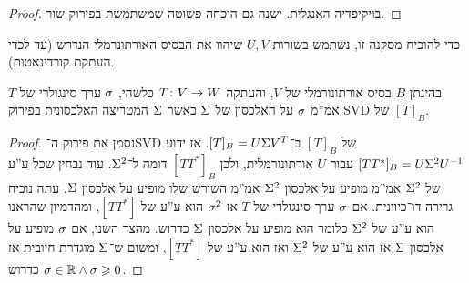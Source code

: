 \documentclass[name=רשימות אלגברה לינארית 2א]{../../../tex/classes/megasumPreamble}
\begin{document}
	\begin{proof}
		בויקיפדיה האנגלית. ישנה גם הוכחה פשוטה שמשתמשת בפירוק שור. 
	\end{proof}
	כדי להוכיח מסקנה זו, נשתמש בשורות $U, V$ שיהוו את הבסיס האורתונרמלי הנדרש (עד לכדי העתקת קורדינאטות). 
	
	\begin{Theorem}
		בהינתן $B$ בסיס אורתונורמלי של $V$, והעתקה $T \colon V \to W$ כלשהי, $\sigma$ ערך סינגולרי של $T$ אמ''מ $\sigma$ על האלכסון של $\Sigma$ כאשר $\Sigma$ המטריצה האלכסונית בפירוק SVD של $[T]_B$. 
	\end{Theorem}
	\begin{proof}
		נסמן את פירוק ה־SVD של $[T]_B$ ב־$[T]_B = U\Sigma V^{T}$. אז ידוע $[TT^*]_B = U\Sigma^2 U^{-1}$ עבור $U$ אורתונורמלית, ולכן $[TT^*]_B$ דומה ל־$\Sigma^2$. עוד נבחין שכל ע''ע של $\Sigma^2$ אמ''מ מופיע על אלכסון $\Sigma^2$ אמ''מ השורש שלו מופיע על אלכסון $\Sigma$. עתה נוכיח גרירה דו־כיוונית. אם $\sigma$ ערך סינגולרי של $T$ אז $\sigma^2$ הוא ע''ע של $[TT^*]$, ומהדמיון שהראנו הוא ע''ע של $\Sigma^2$ כלומר הוא מופיע על אלכסון $\Sigma$ כדרוש. מהצד השני, אם $\sigma$ מופיע על אלכסון $\Sigma$ אז הוא ע''ע של $\Sigma^2$ ואז הוא ע''ע של $[TT^*]$, ומשום ש־$\Sigma$ מוגדרת חיובית אז $\sigma \in \mathbb{R} \land \sigma \geqslant 0$ כדרוש. 
	\end{proof}
	
\end{document}
